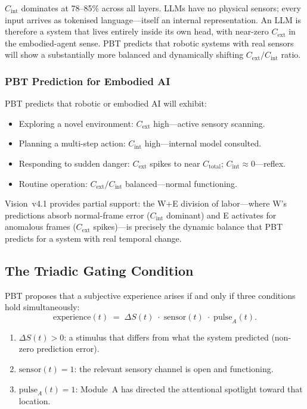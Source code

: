 \documentclass[12pt,a4paper]{article}
\newcommand{\Cext}{C_{\mathrm{ext}}}
\newcommand{\Cint}{C_{\mathrm{int}}}
\begin{document}
$\Cint$ dominates at 78--85\% across all layers. LLMs have no physical
sensors; every input arrives as tokenised language---itself an internal
representation. An LLM is therefore a system that lives entirely inside its
own head, with near-zero $\Cext$ in the embodied-agent sense. PBT predicts
that robotic systems with real sensors will show a substantially more balanced
and dynamically shifting $\Cext/\Cint$ ratio.

\subsubsection{PBT Prediction for Embodied AI}

PBT predicts that robotic or embodied AI will exhibit:
\begin{itemize}[leftmargin=1.8em]
  \item Exploring a novel environment: $\Cext$ high---active sensory scanning.
  \item Planning a multi-step action: $\Cint$ high---internal model consulted.
  \item Responding to sudden danger: $\Cext$ spikes to near $C_{\mathrm{total}}$;
    $\Cint\approx 0$---reflex.
  \item Routine operation: $\Cext/\Cint$ balanced---normal functioning.
\end{itemize}

Vision~v4.1 provides partial support: the W+E division of labor---where W's
predictions absorb normal-frame error ($\Cint$ dominant) and E activates for
anomalous frames ($\Cext$ spikes)---is precisely the dynamic balance that PBT
predicts for a system with real temporal change.

\subsection{The Triadic Gating Condition}

PBT proposes that a subjective experience arises if and only if three conditions
hold simultaneously:
\begin{equation}
  \mathrm{experience}(t)
  \;=\; \Delta S(t)\;\cdot\;\mathrm{sensor}(t)\;\cdot\;\mathrm{pulse}_A(t).
  \label{eq:triadic}
\end{equation}

\begin{enumerate}[leftmargin=1.8em]
  \item $\Delta S(t) > 0$: a stimulus that differs from what the system
    predicted (non-zero prediction error).
  \item $\mathrm{sensor}(t) = 1$: the relevant sensory channel is open and
    functioning.
  \item $\mathrm{pulse}_A(t) = 1$: Module~A has directed the attentional
    spotlight toward that location.
\end{enumerate}
\end{document}
